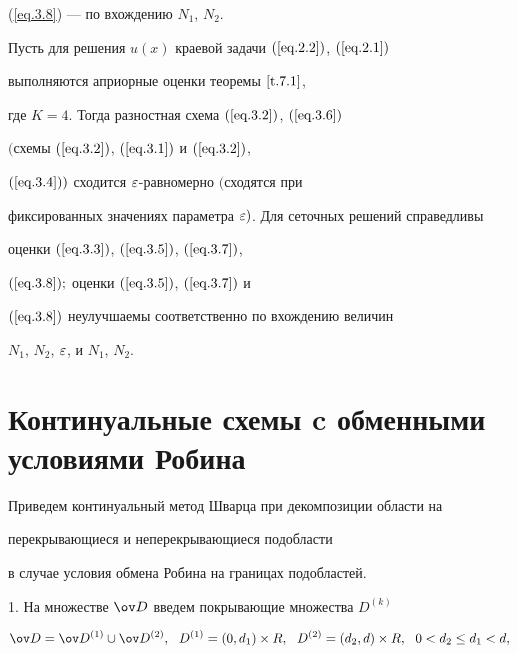 (\ref{eq.3.8}) --- по вхождению $N_1$, $N_2$.








\begin{thms} \label{t.3.1}


Пусть для решения $u(x)$ краевой задачи $(\ref{eq.2.2})$, $(\ref{eq.2.1})$


выполняются априорные оценки теоремы $\ref{t.7.1}$,


где $K=4$. Тогда разностная схема $(\ref{eq.3.2})$, $(\ref{eq.3.6})$


$($схемы $(\ref{eq.3.2})$, $(\ref{eq.3.1})$ и $(\ref{eq.3.2})$,


$(\ref{eq.3.4}))$ сходится $\varepsilon$-равномерно $($сходятся при


фиксированных значениях параметра $\varepsilon)$. Для сеточных решений справедливы


оценки $(\ref{eq.3.3})$, $(\ref{eq.3.5})$, $(\ref{eq.3.7})$,


$(\ref{eq.3.8});$ оценки $(\ref{eq.3.5})$, $(\ref{eq.3.7})$ и


$(\ref{eq.3.8})$ неулучшаемы соответственно по вхождению величин


$N_1$, $N_2$, $\varepsilon$, и $N_1$, $N_2$.


\end{thms}








\section{Континуальные схемы c обменными условиями Робина}


\label{section.4}








Приведем континуальный метод Шварца при декомпозиции области на


перекрывающиеся и неперекрывающиеся подобласти


в случае условия обмена Робина на границах подобластей.


\medskip





1. На множестве $\od$ введем покрывающие множества $D^{(k)}$


\begin{equation} \label{eq.4.1}


\od=\od^{(1)} \cup \od^{(2)},\ \ D^{(1)}=(0,d_1) \times R,\ \ D^{(2)}=


(d_2,d) \times R, \ \ 0 < d_2 \leq d_1 < d,


\end{equation}


